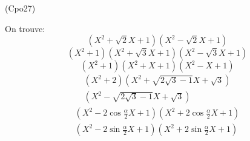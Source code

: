\begin{tiny}(Cpo27)\end{tiny} On trouve:
\begin{displaymath}
 (X^2+\sqrt{2}X+1)(X^2-\sqrt{2}X+1)
\end{displaymath}
\begin{displaymath}
 (X^2+1)(X^2+\sqrt{3}X+1)(X^2-\sqrt{3}X+1)
\end{displaymath}
\begin{displaymath}
 (X^2+1)(X^2+X+1)(X^2-X+1)
\end{displaymath}
\begin{multline*}
(X^2+2)
(X^2+ \sqrt{2\sqrt{3}-1} X+\sqrt{3})\\
(X^2- \sqrt{2\sqrt{3}-1} X+\sqrt{3})
\end{multline*}
\begin{multline*}
 (X^2-2\cos\frac{\alpha}{2} X +1)(X^2+2\cos\frac{\alpha}{2} X +1) \\
(X^2-2\sin\frac{\alpha}{2} X +1)(X^2+2\sin\frac{\alpha}{2} X +1)
\end{multline*}

